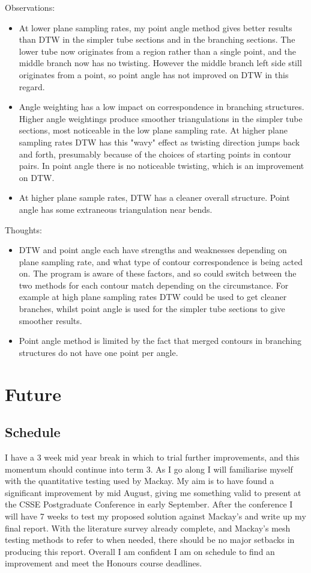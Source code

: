 \documentclass[11pt]{article}
\begin{document}
Observations:
\begin{itemize}
\item At lower plane sampling rates, my point angle method gives better results than DTW in the simpler tube sections and in the branching sections. The lower tube now originates from a region rather than a single point, and the middle branch now has no twisting. However the middle branch left side still originates from a point, so point angle has not improved on DTW in this regard.
\item Angle weighting has a low impact on correspondence in branching structures. Higher angle weightings produce smoother triangulations in the simpler tube sections, most noticeable in the low plane sampling rate. At higher plane sampling rates DTW has this "wavy" effect as twisting direction jumps back and forth, presumably because of the choices of starting points in contour pairs. In point angle there is no noticeable twisting, which is an improvement on DTW.
\item At higher plane sample rates, DTW has a cleaner overall structure. Point angle has some extraneous triangulation near bends.
\end{itemize}

Thoughts:
\begin{itemize}
\item DTW and point angle each have strengths and weaknesses depending on plane sampling rate, and what type of contour correspondence is being acted on. The program is aware of these factors, and so could switch between the two methods for each contour match depending on the circumstance. For example at high plane sampling rates DTW could be used to get cleaner branches, whilst point angle is used for the simpler tube sections to give smoother results.
\item Point angle method is limited by the fact that merged contours in branching structures do not have one point per angle.
\end{itemize}

\section{Future}

\subsection{Schedule}

I have a 3 week mid year break in which to trial further improvements, and this momentum should continue into term 3. As I go along I will familiarise myself with the quantitative testing used by Mackay. My aim is to have found a significant improvement by mid August, giving me something valid to present at the CSSE Postgraduate Conference in early September. After the conference I will have 7 weeks to test my proposed solution against Mackay's and write up my final report. With the literature survey already complete, and Mackay's mesh testing methods to refer to when needed, there should be no major setbacks in producing this report. Overall I am confident I am on schedule to find an improvement and meet the Honours course deadlines.
\end{document}
